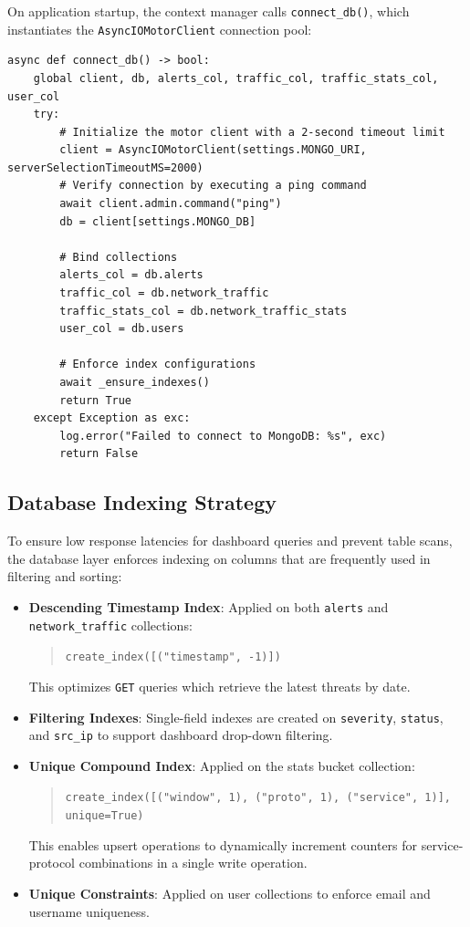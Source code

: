 \documentclass[12pt,a4paper]{report}
\begin{document}
On application startup, the context manager calls \texttt{connect\_db()}, which instantiates the \texttt{AsyncIOMotorClient} connection pool:

\begin{lstlisting}[style=pythonstyle, caption={Asynchronous MongoDB connection initialization}]
async def connect_db() -> bool:
    global client, db, alerts_col, traffic_col, traffic_stats_col, user_col
    try:
        # Initialize the motor client with a 2-second timeout limit
        client = AsyncIOMotorClient(settings.MONGO_URI, serverSelectionTimeoutMS=2000)
        # Verify connection by executing a ping command
        await client.admin.command("ping")
        db = client[settings.MONGO_DB]

        # Bind collections
        alerts_col = db.alerts
        traffic_col = db.network_traffic
        traffic_stats_col = db.network_traffic_stats
        user_col = db.users

        # Enforce index configurations
        await _ensure_indexes()
        return True
    except Exception as exc:
        log.error("Failed to connect to MongoDB: %s", exc)
        return False
\end{lstlisting}

\subsection{Database Indexing Strategy}

To ensure low response latencies for dashboard queries and prevent table scans, the database layer enforces indexing on columns that are frequently used in filtering and sorting:
\begin{itemize}[leftmargin=1.5em]
  \item \textbf{Descending Timestamp Index}: Applied on both \texttt{alerts} and \texttt{network\_traffic} collections:
    \begin{quote}
      \texttt{create\_index([("timestamp", -1)])}
    \end{quote}
    This optimizes \texttt{GET} queries which retrieve the latest threats by date.
  \item \textbf{Filtering Indexes}: Single-field indexes are created on \texttt{severity}, \texttt{status}, and \texttt{src\_ip} to support dashboard drop-down filtering.
  \item \textbf{Unique Compound Index}: Applied on the stats bucket collection:
    \begin{quote}
      \texttt{create\_index([("window", 1), ("proto", 1), ("service", 1)], unique=True)}
    \end{quote}
    This enables upsert operations to dynamically increment counters for service-protocol combinations in a single write operation.
  \item \textbf{Unique Constraints}: Applied on user collections to enforce email and username uniqueness.
\end{itemize}
\end{document}

